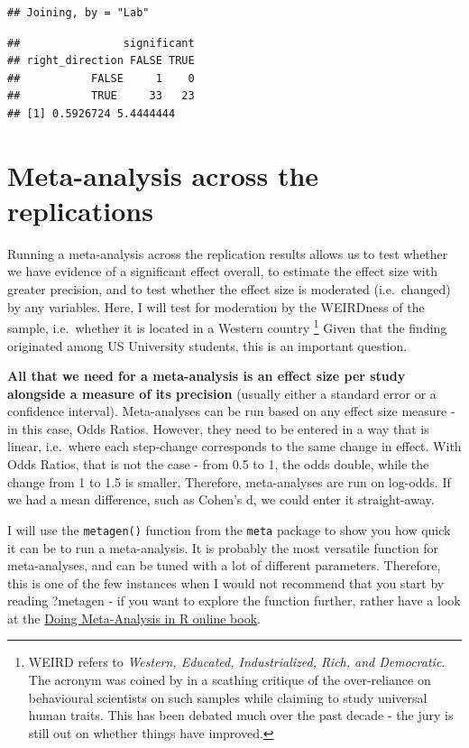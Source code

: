 \documentclass[
]{book}
\begin{document}
\begin{verbatim}
## Joining, by = "Lab"
\end{verbatim}

\begin{verbatim}
##                significant
## right_direction FALSE TRUE
##           FALSE     1    0
##           TRUE     33   23
## [1] 0.5926724 5.4444444
\end{verbatim}

\hypertarget{meta-analysis-across-the-replications}{%
\section{Meta-analysis across the replications}\label{meta-analysis-across-the-replications}}

Running a meta-analysis across the replication results allows us to test whether we have evidence of a significant effect overall, to estimate the effect size with greater precision, and to test whether the effect size is moderated (i.e.~changed) by any variables. Here, I will test for moderation by the WEIRDness of the sample, i.e.~whether it is located in a Western country \footnote{WEIRD refers to \emph{Western, Educated, Industrialized, Rich, and Democratic}. The acronym was coined by \citet{henrichWeirdestPeopleWorld2010} in a scathing critique of the over-reliance on behavioural scientists on such samples while claiming to study universal human traits. This has been debated much over the past decade - the jury is still out on whether things have improved.}
Given that the finding originated among US University students, this is an important question.

\textbf{All that we need for a meta-analysis is an effect size per study alongside a measure of its precision} (usually either a standard error or a confidence interval). Meta-analyses can be run based on any effect size measure - in this case, Odds Ratios. However, they need to be entered in a way that is linear, i.e.~where each step-change corresponds to the same change in effect. With Odds Ratios, that is not the case - from 0.5 to 1, the odds double, while the change from 1 to 1.5 is smaller. Therefore, meta-analyses are run on log-odds. If we had a mean difference, such as Cohen's d, we could enter it straight-away.

I will use the \texttt{metagen()} function from the \texttt{meta} package to show you how quick it can be to run a meta-analysis. It is probably the most versatile function for meta-analyses, and can be tuned with a lot of different parameters. Therefore, this is one of the few instances when I would not recommend that you start by reading ?metagen - if you want to explore the function further, rather have a look at the \href{https://bookdown.org/MathiasHarrer/Doing_Meta_Analysis_in_R}{Doing Meta-Analysis in R online book}.
\end{document}
